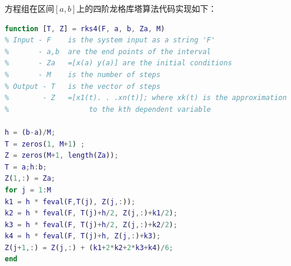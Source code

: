 \documentclass[UTF8]{ctexart}
\begin{document}
方程组在区间$[a,b]$上的四阶龙格库塔算法代码实现如下：
\begin{lstlisting}[language=matlab]
function [T, Z] = rks4(F, a, b, Za, M)
% Input - F    is the system input as a string 'F'
%       - a,b  are the end points of the interval
%       - Za   =[x(a) y(a)] are the initial conditions
%       - M    is the number of steps
% Output - T   is the vector of steps
%        - Z   =[x1(t). . .xn(t)]; where xk(t) is the approximation
%                   to the kth dependent variable

h = (b-a)/M;
T = zeros(1, M+1) ;
Z = zeros(M+1, length(Za));
T = a;h:b;
Z(1,:) = Za;
for j = 1:M
k1 = h * feval(F,T(j), Z(j,:));
k2 = h * feval(F, T(j)+h/2, Z(j,:)+k1/2);
k3 = h * feval(F, T(j)+h/2, Z(j,:)+k2/2);
k4 = h * feval(F, T(j)+h, Z(j,:)+k3);
Z(j+1,:) = Z(j,:) + (k1+2*k2+2*k3+k4)/6;
end
\end{lstlisting}
\end{document}
